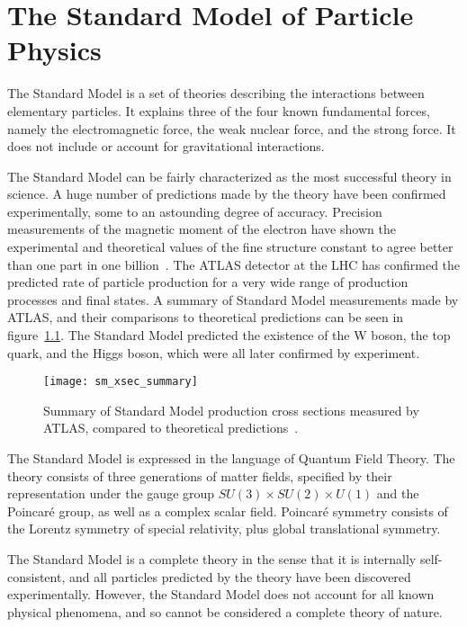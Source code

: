\chapter{The Standard Model of Particle Physics}\label{ch:sm}

The Standard Model is a set of theories describing the interactions between elementary particles.
It explains three of the four known fundamental forces, namely the electromagnetic force,
the weak nuclear force, and the strong force.
It does not include  or account for gravitational interactions.

The Standard Model can be fairly characterized as the most successful theory in science.
A huge number of predictions made by the theory have been confirmed experimentally,
some to an astounding degree of accuracy.
Precision measurements of the magnetic moment of the electron have shown the experimental and theoretical values of the
fine structure constant to agree better than one part in one billion~\cite{sm-fine-structure-2008}.
The ATLAS detector at the LHC has confirmed the predicted rate of particle production for a very wide range of
production processes and final states.
A summary of Standard Model measurements made by ATLAS, and their comparisons to theoretical predictions can be seen in figure~\ref{fig:sm_xsec_summary}.
The Standard Model predicted the existence of the W boson, the top quark, and the Higgs boson,
which were all later confirmed by experiment.

\begin{figure}[!ht]
    \centering
\texttt{[image: sm\_xsec\_summary]}
\caption{Summary of Standard Model production cross sections measured by ATLAS, compared to theoretical predictions~\cite{sm-summary-plots}.}
\label{fig:sm_xsec_summary}
\end{figure}

The Standard Model is expressed in the language of Quantum Field Theory.
The theory consists of three generations of matter fields,
specified by their representation under the gauge group $SU(3)\times SU(2)\times U(1)$ and the Poincar\'e group,
as well as a complex scalar field.
Poincar\'e symmetry consists of the Lorentz symmetry of special relativity, plus global translational symmetry.

The Standard Model is a complete theory in the sense that it is internally self-consistent,
and all particles predicted by the theory have been discovered experimentally.
However, the Standard Model does not account for all known physical phenomena,
and so cannot be considered a complete theory of nature.

